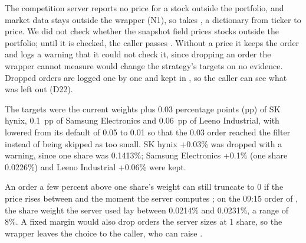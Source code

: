 The competition server reports no price for a stock outside the portfolio, and market data stays outside the wrapper (N1), so  takes , a dictionary from ticker to price. We did not check whether the snapshot field  prices stocks outside the portfolio; until it is checked, the caller passes . Without a price it keeps the order and logs a warning that it could not check it, since dropping an order the wrapper cannot measure would change the strategy's targets on no evidence. Dropped orders are logged one by one and kept in , so the caller can see what was left out (D22).

 The targets were the current weights plus 0.03 percentage points (pp) of SK hynix, 0.1~pp of Samsung Electronics and 0.06~pp of Leeno Industrial, with  lowered from its default of 0.05 to 0.01 so that the 0.03 order reached the filter instead of being skipped as too small. SK hynix +0.03\% was dropped with a warning, since one share was 0.1413\%; Samsung Electronics +0.1\% (one share 0.0226\%) and Leeno Industrial +0.06\% were kept.

 An order a few percent above one share's weight can still truncate to 0 if the price rises between  and the moment the server computes ; on the 09:15 order of , the share weight the server used lay between 0.0214\% and 0.0231\%, a range of 8\%. A fixed margin would also drop orders the server sizes at 1 share, so the wrapper leaves the choice to the caller, who can raise .


